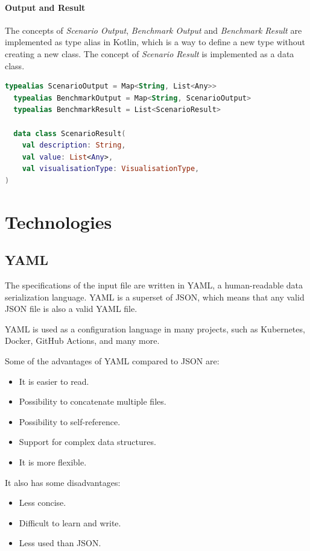 \documentclass[12pt,a4paper,openright,twoside]{book}
\begin{document}
\paragraph*{Output and Result}

The concepts of \emph{Scenario Output}, \emph{Benchmark Output} and \emph{Benchmark Result} are implemented as type alias in Kotlin, which is a way to define a new type without creating a new class.
The concept of \emph{Scenario Result} is implemented as a data class.

\begin{lstlisting}[language=Kotlin]
  typealias ScenarioOutput = Map<String, List<Any>>
  typealias BenchmarkOutput = Map<String, ScenarioOutput>
  typealias BenchmarkResult = List<ScenarioResult>

  data class ScenarioResult(
    val description: String,
    val value: List<Any>,
    val visualisationType: VisualisationType,
)
\end{lstlisting}

\section{Technologies}

\subsection*{YAML}
The specifications of the input file are written in YAML, a human-readable data serialization language.
YAML is a superset of JSON, which means that any valid JSON file is also a valid YAML file.

YAML is used as a configuration language in many projects, such as Kubernetes, Docker, GitHub Actions, and many more.

Some of the advantages of YAML compared to JSON are:
\begin{itemize}
  \item It is easier to read.
  \item Possibility to concatenate multiple files.
  \item Possibility to self-reference.
  \item Support for complex data structures.
  \item It is more flexible.
\end{itemize}

It also has some disadvantages:
\begin{itemize}
  \item Less concise.
  \item Difficult to learn and write.
  \item Less used than JSON.
\end{itemize}
\end{document}
